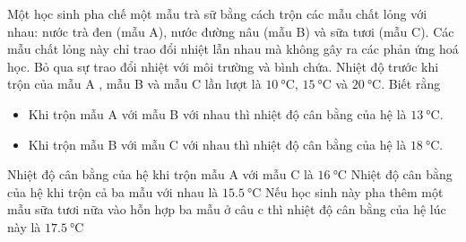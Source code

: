 \begin{ex}
	Một học sinh pha chế một mẫu trà sữ bằng cách trộn các mẫu chất lỏng với nhau: nước trà đen (mẫu A), nước đường nâu (mẫu B) và sữa tươi (mẫu C). Các mẫu chất lỏng này chỉ trao đổi nhiệt lẫn nhau mà không gây ra các phản ứng hoá học. Bỏ qua sự trao đổi nhiệt với môi trường và bình chứa. Nhiệt độ trước khi trộn của mẫu A , mẫu B và mẫu C lần lượt là $\SI{10}{\celsius}$, $\SI{15}{\celsius}$ và $\SI{20}{\celsius}$. Biết rằng
	\begin{itemize}
		\item Khi trộn mẫu A với mẫu B với nhau thì nhiệt độ cân bằng của hệ là $\SI{13}{\celsius}$.
		\item Khi trộn mẫu B với mẫu C với nhau thì nhiệt độ cân bằng của hệ là $\SI{18}{\celsius}$.
	\end{itemize}
	{Nhiệt độ cân bằng của hệ khi trộn mẫu A với mẫu C là $\SI{16}{\celsius}$}
	{Nhiệt độ cân bằng của hệ khi trộn cả ba mẫu với nhau là $\SI{15.5}{\celsius}$}
	{\True Nếu học sinh này pha thêm một mẫu sữa tươi nữa vào hỗn hợp ba mẫu ở câu c thì nhiệt độ cân bằng của hệ lúc này là $\SI{17.5}{\celsius}$}
\end{ex}
